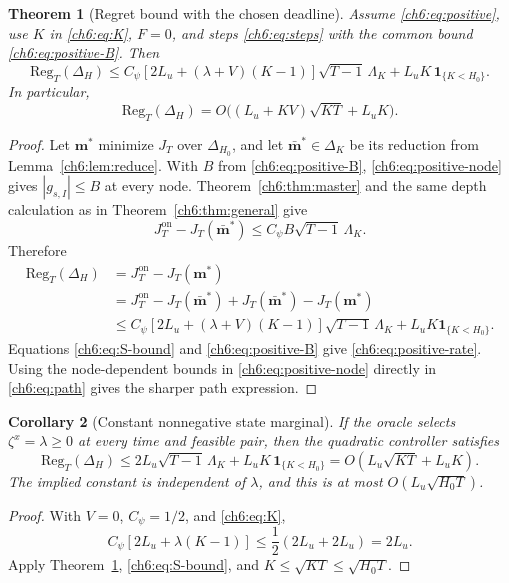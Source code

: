 \documentclass[11pt]{article}
\newcommand{\Reg}{\mathrm{Reg}}
\newcommand{\ind}[1]{\mathbf{1}_{\{#1\}}}
\theoremstyle{plain}
\newtheorem{Thm:Theorem}{Theorem}[section]
\newtheorem{Thm:Corollary}[Thm:Theorem]{Corollary}
\theoremstyle{remark}
\numberwithin{equation}{section}
\begin{document}
\begin{Thm:Theorem}[Regret bound with the chosen deadline]\label{ch6:thm:positive}
Assume \eqref{ch6:eq:positive}, use $K$ in \eqref{ch6:eq:K}, $F=0$, and steps
\eqref{ch6:eq:steps} with the common bound \eqref{ch6:eq:positive-B}. Then
\begin{equation}\label{ch6:eq:positive-upper}
 \boxed{\Reg_T(\Delta_H)\le
 {C_\psi}[2L_u+(\lambda+V)(K-1)]\sqrt{T-1}\,\Lambda_K
 +L_uK\,\ind{K<H_0}.}
\end{equation}
In particular,
\begin{equation}\label{ch6:eq:positive-rate}
 \Reg_T(\Delta_H)=O\bigl((L_u+KV)\sqrt{KT}+L_uK\bigr).
\end{equation}
\end{Thm:Theorem}
\begin{proof}
Let $\mathbf m^*$ minimize $J_T$ over $\Delta_{H_0}$, and let
$\bar{\mathbf m}^*\in\Delta_K$ be its reduction from
Lemma~\ref{ch6:lem:reduce}.  With $B$ from \eqref{ch6:eq:positive-B},
\eqref{ch6:eq:positive-node} gives $|g_{s,I}|\le B$ at every node.
Theorem~\ref{ch6:thm:master} and the same depth calculation as in
Theorem~\ref{ch6:thm:general} give
\[
J_T^{\mathrm{on}}-J_T(\bar{\mathbf m}^*)
\le C_\psi B\sqrt{T-1}\,\Lambda_K.
\]
Therefore
\begin{align*}
\Reg_T(\Delta_H)
&=J_T^{\mathrm{on}}-J_T(\mathbf m^*)\\
&=J_T^{\mathrm{on}}-J_T(\bar{\mathbf m}^*)
  +J_T(\bar{\mathbf m}^*)-J_T(\mathbf m^*)\\
&\le C_\psi[2L_u+(\lambda+V)(K-1)]
  \sqrt{T-1}\,\Lambda_K
  +L_uK\ind{K<H_0}.
\end{align*}
Equations \eqref{ch6:eq:S-bound} and \eqref{ch6:eq:positive-B} give
\eqref{ch6:eq:positive-rate}.
Using the node-dependent bounds in \eqref{ch6:eq:positive-node} directly
in \eqref{ch6:eq:path} gives the sharper path expression.
\end{proof}

\begin{Thm:Corollary}[Constant nonnegative state marginal]\label{ch6:cor:constant}
If the oracle selects $\zeta^x=\lambda\ge0$ at every time and feasible pair,
then the quadratic controller satisfies
\begin{equation}\label{ch6:eq:constant}
 \Reg_T(\Delta_H)\le2L_u\sqrt{T-1}\,\Lambda_K
 +L_uK\,\ind{K<H_0}
 =O(L_u\sqrt{KT}+L_uK).
\end{equation}
The implied constant is independent of $\lambda$, and this is at most
$O(L_u\sqrt{H_0T})$.
\end{Thm:Corollary}
\begin{proof}
With $V=0$, $C_\psi=1/2$, and \eqref{ch6:eq:K},
\[
C_\psi[2L_u+\lambda(K-1)]
\le\frac12(2L_u+2L_u)=2L_u.
\]
Apply Theorem~\ref{ch6:thm:positive}, \eqref{ch6:eq:S-bound}, and
$K\le\sqrt{KT}\le\sqrt{H_0T}$.
\end{proof}
\end{document}
